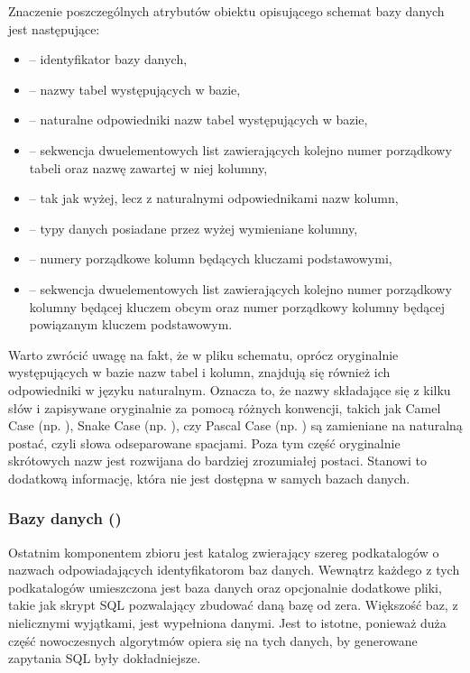 \begin{minipage}{\linewidth}

\end{minipage}

Znaczenie poszczególnych atrybutów obiektu opisującego schemat bazy danych jest następujące:\nobreakpar
\begin{itemize}
    \item \textbf{} -- identyfikator bazy danych,
    \item \textbf{} -- nazwy tabel występujących w bazie,
    \item \textbf{} -- naturalne odpowiedniki nazw tabel występujących w bazie,
    \item \textbf{} -- sekwencja dwuelementowych list zawierających kolejno numer porządkowy tabeli oraz nazwę zawartej w niej kolumny,
    \item \textbf{} -- tak jak wyżej, lecz z naturalnymi odpowiednikami nazw kolumn,
    \item \textbf{} -- typy danych posiadane przez wyżej wymieniane kolumny,
    \item \textbf{} -- numery porządkowe kolumn będących kluczami podstawowymi,
    \item \textbf{} -- sekwencja dwuelementowych list zawierających kolejno numer porządkowy kolumny będącej kluczem obcym oraz numer porządkowy kolumny będącej powiązanym kluczem podstawowym.
\end{itemize}

Warto zwrócić uwagę na fakt, że w pliku schematu, oprócz oryginalnie występujących w bazie nazw tabel i kolumn, znajdują się również ich odpowiedniki w języku naturalnym. Oznacza to, że nazwy składające się z kilku słów i zapisywane oryginalnie za pomocą różnych konwencji, takich jak Camel Case (np. ), Snake Case (np. ), czy Pascal Case (np. ) są zamieniane na naturalną postać, czyli słowa odseparowane spacjami. Poza tym część oryginalnie skrótowych nazw jest rozwijana do bardziej zrozumiałej postaci. Stanowi to dodatkową informację, która nie jest dostępna w samych bazach danych.

\subsubsection{Bazy danych ()}
Ostatnim komponentem zbioru  jest katalog  zwierający szereg podkatalogów o nazwach odpowiadających identyfikatorom baz danych. Wewnątrz każdego z tych podkatalogów umieszczona jest baza danych  oraz opcjonalnie dodatkowe pliki, takie jak skrypt SQL pozwalający zbudować daną bazę od zera. Większość baz, z nielicznymi wyjątkami, jest wypełniona danymi. Jest to istotne, ponieważ duża część nowoczesnych algorytmów opiera się na tych danych, by generowane zapytania SQL były dokładniejsze.

